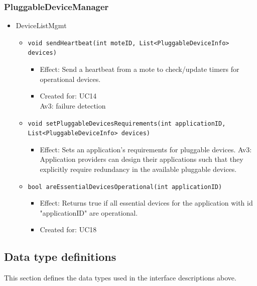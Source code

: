     \subsubsection{PluggableDeviceManager}
        \begin{itemize}
        	\item DeviceListMgmt
        	\begin{itemize}
        		\item \texttt{void sendHeartbeat(int moteID, List<PluggableDeviceInfo> devices)}
        		\begin{itemize}
        			\item Effect: Send a heartbeat from a mote to check/update timers for operational devices.
        			\item Created for: UC14 \\
                          Av3: failure detection
        		\end{itemize}
                \item \texttt{void setPluggableDevicesRequirements(int applicationID, List<PluggableDeviceInfo> devices)}
                \begin{itemize}
                    \item Effect: Sets an application's requirements for pluggable devices.
                          Av3: Application providers can design their applications
                          such that they explicitly require redundancy in
                          the available pluggable devices.
                \end{itemize}
        		\item \texttt{bool areEssentialDevicesOperational(int applicationID)}
        		\begin{itemize}
        			\item Effect: Returns true if all essential devices for the application
                                  with id "applicationID" are operational.
        			\item Created for: UC18
        		\end{itemize}
        	\end{itemize}
        \end{itemize}


\subsection{Data type definitions}
    This section defines the data types used in the interface descriptions above.

